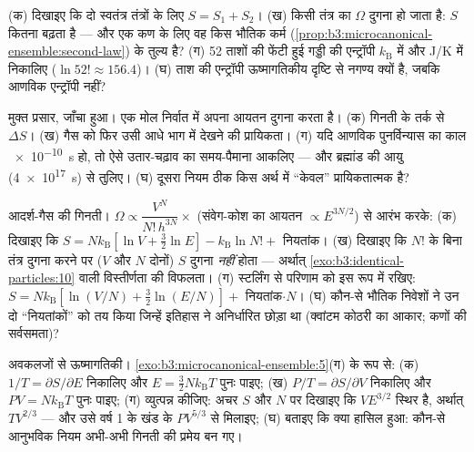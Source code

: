 \begin{exercise}[$\star$]\label{exo:b3:microcanonical-ensemble:3}
(क) दिखाइए कि दो स्वतंत्र तंत्रों के लिए $S = S_1 + S_2$। (ख) किसी
तंत्र का $\Omega$ दुगना हो जाता है: $S$ कितना बढ़ता है --- और एक कण
के लिए वह किस भौतिक कर्म
(\cref{prop:b3:microcanonical-ensemble:second-law})
के तुल्य है? (ग) 52 ताशों की फेंटी हुई गड्डी की एन्ट्रॉपी
$k_{\text{B}}$ में और J/K में निकालिए
($\ln52! \approx 156.4$)। (घ) ताश की एन्ट्रॉपी ऊष्मागतिकीय दृष्टि से
नगण्य क्यों है, जबकि आणविक एन्ट्रॉपी नहीं?
\end{exercise}

\begin{exercise}[$\star$]\label{exo:b3:microcanonical-ensemble:4}
मुक्त प्रसार, जाँचा हुआ। एक मोल निर्वात में अपना आयतन दुगना करता है।
(क) गिनती के तर्क से $\Delta S$। (ख) गैस को फिर उसी आधे भाग में
देखने की प्रायिकता। (ग) यदि आणविक पुनर्विन्यास का काल
\qty{e-10}{s} हो, तो ऐसे उतार-चढ़ाव का समय-पैमाना आकलिए --- और
ब्रह्मांड की आयु (\qty{4e17}{s}) से तुलिए। (घ) दूसरा नियम ठीक किस
अर्थ में ``केवल'' प्रायिकतात्मक है?
\end{exercise}

\begin{exercise}[$\star\star$]\label{exo:b3:microcanonical-ensemble:5}
आदर्श-गैस की गिनती।
$\Omega \propto \dfrac{V^N}{N!\,h^{3N}}\times$ (संवेग-कोश का
आयतन $\propto E^{3N/2}$) से आरंभ करके: (क) दिखाइए कि $S = Nk_{\text{B}}[\ln V +
\tfrac32\ln E] - k_{\text{B}}\ln N! + $ नियतांक। (ख) दिखाइए कि
$N!$ के बिना तंत्र दुगना करने पर ($V$ और $N$ दोनों)
$S$ दुगना \emph{नहीं} होता --- अर्थात्
\cref{exo:b3:identical-particles:10} वाली विस्तीर्णता की विफलता। (ग)
स्टर्लिंग से परिणाम को इस रूप में रखिए: $S = Nk_{\text{B}}[\ln(V/N) + \tfrac32\ln(E/N)]
+ $ नियतांक$\cdot N$। (घ) कौन-से भौतिक निवेशों ने उन दो
``नियतांकों'' को तय किया जिन्हें इतिहास ने अनिर्धारित छोड़ा था
(क्वांटम कोठरी का आकार; कणों की सर्वसमता)?
\end{exercise}

\begin{exercise}[$\star\star$]\label{exo:b3:microcanonical-ensemble:6}
अवकलजों से ऊष्मागतिकी।
\cref{exo:b3:microcanonical-ensemble:5}(ग) के रूप से: (क) $1/T =
\partial S/\partial E$ निकालिए और $E = \tfrac32 Nk_{\text{B}}T$ पुनः पाइए;
(ख) $P/T = \partial S/\partial V$ निकालिए और $PV =
Nk_{\text{B}}T$ पुनः पाइए; (ग)  व्युत्पन्न कीजिए: अचर
$S$ और $N$ पर दिखाइए कि $VE^{3/2}$ स्थिर है, अर्थात् $TV^{2/3}$ --- और
उसे वर्ष 1 के खंड के $PV^{5/3}$ से मिलाइए; (घ) बताइए कि क्या हासिल
हुआ: कौन-से आनुभविक नियम अभी-अभी गिनती की प्रमेय बन गए।
\end{exercise}

